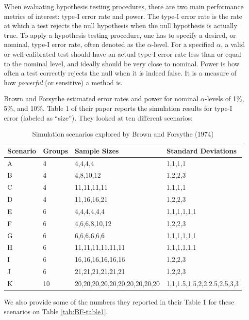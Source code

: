 \documentclass[
]{book}
\begin{document}
When evaluating hypothesis testing procedures, there are two main performance metrics of interest: type-I error rate and power.
The type-I error rate is the rate at which a test rejects the null hypothesis when the null hypothesis is actually true.
To apply a hypothesis testing procedure, one has to specify a desired, or nominal, type-I error rate, often denoted as the \(\alpha\)-level.
For a specified \(\alpha\), a valid or well-calibrated test should have an actual type-I error rate less than or equal to the nominal level, and ideally should be very close to nominal.
Power is how often a test correctly rejects the null when it is indeed false.
It is a measure of how \emph{powerful} (or sensitive) a method is.

Brown and Forsythe estimated error rates and power for nominal \(\alpha\)-levels of 1\%, 5\%, and 10\%.
Table 1 of their paper reports the simulation results for type-I error (labeled as ``size'').
They looked at ten different scenarios:

\begin{table}
\centering
\caption{\label{tab:BF-Scenarios}Simulation scenarios explored by Brown and Forsythe (1974)}
\centering
\begin{tabular}[t]{l|l|l|l}
\hline
Scenario & Groups & Sample Sizes & Standard Deviations\\
\hline
A & 4 & 4,4,4,4 & 1,1,1,1\\
\hline
B & 4 & 4,8,10,12 & 1,2,2,3\\
\hline
C & 4 & 11,11,11,11 & 1,1,1,1\\
\hline
D & 4 & 11,16,16,21 & 1,2,2,3\\
\hline
E & 6 & 4,4,4,4,4,4 & 1,1,1,1,1,1\\
\hline
F & 6 & 4,6,6,8,10,12 & 1,2,2,3\\
\hline
G & 6 & 6,6,6,6,6,6 & 1,1,1,1,1,1\\
\hline
H & 6 & 11,11,11,11,11,11 & 1,1,1,1,1,1\\
\hline
I & 6 & 16,16,16,16,16,16 & 1,2,2,3\\
\hline
J & 6 & 21,21,21,21,21,21 & 1,2,2,3\\
\hline
K & 10 & 20,20,20,20,20,20,20,20,20,20 & 1,1,1.5,1.5,2,2,2.5,2.5,3,3\\
\hline
\end{tabular}
\end{table}

We also provide some of the numbers they reported in their Table 1 for these scenarios on Table \ref{tab:BF-table1}.
\end{document}
